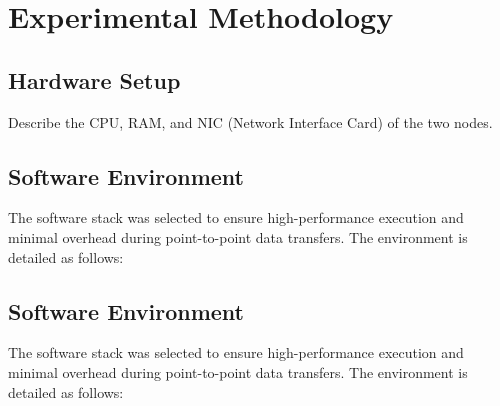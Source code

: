 \documentclass[11pt,a4paper]{article}
\begin{document}
	
	
	\section{Experimental Methodology}
	\label{sec:methodology}
	
	\subsection{Hardware Setup}
	Describe the CPU, RAM, and NIC (Network Interface Card) of the two nodes.
	
	\subsection{Software Environment}
	The software stack was selected to ensure high-performance execution and minimal overhead during point-to-point data transfers. The environment is detailed as follows:
	
	\subsection{Software Environment}
	The software stack was selected to ensure high-performance execution and minimal overhead during point-to-point data transfers. The environment is detailed as follows:
	
\end{document}
